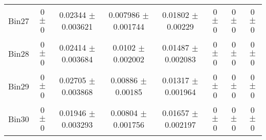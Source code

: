 \begin{tabular}{@{\extracolsep{4pt}}lccccccc@{}}
     Bin27 & 0 $\pm$ 0 & 0.02344 $\pm$ 0.003621 & 0.007986 $\pm$ 0.001744 & 0.01802 $\pm$ 0.00229 & 0 $\pm$ 0 & 0 $\pm$ 0 & 0 $\pm$ 0 \\ 
     Bin28 & 0 $\pm$ 0 & 0.02414 $\pm$ 0.003684 & 0.0102 $\pm$ 0.002002 & 0.01487 $\pm$ 0.002083 & 0 $\pm$ 0 & 0 $\pm$ 0 & 0 $\pm$ 0 \\ 
     Bin29 & 0 $\pm$ 0 & 0.02705 $\pm$ 0.003868 & 0.00886 $\pm$ 0.00185 & 0.01317 $\pm$ 0.001964 & 0 $\pm$ 0 & 0 $\pm$ 0 & 0 $\pm$ 0 \\ 
     Bin30 & 0 $\pm$ 0 & 0.01946 $\pm$ 0.003293 & 0.00804 $\pm$ 0.001756 & 0.01657 $\pm$ 0.002197 & 0 $\pm$ 0 & 0 $\pm$ 0 & 0 $\pm$ 0 \\ 
\hline\hline
  \end{tabular}
